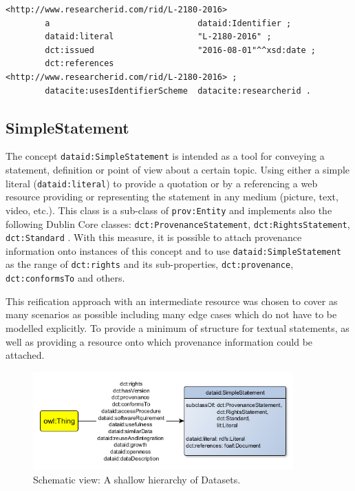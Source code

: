 \documentclass[a4paper,english,twoside,BCOR1.5cm,headsepline,DIV12,appendixprefix,final,12pt]{scrbook}
\newcommand{\prop}[1]{{{\texttt{#1}}}}
\begin{document}
\begin{lstlisting}[language=ttl, captionpos=b,caption=Example of an organisation,label=lst:coresuperset,linewidth=\columnwidth,breaklines=true]
<http://www.researcherid.com/rid/L-2180-2016>
        a                              dataid:Identifier ;
        dataid:literal                 "L-2180-2016" ;                                        
        dct:issued                     "2016-08-01"^^xsd:date ;
        dct:references                 <http://www.researcherid.com/rid/L-2180-2016> ;        
        datacite:usesIdentifierScheme  datacite:researcherid .  
\end{lstlisting}

\subsection{SimpleStatement} 
\label{sec:corestatement}
The concept \prop{dataid:SimpleStatement} is intended as a tool for conveying a statement, definition or point of view about a certain topic. Using either a simple literal (\prop{dataid:literal}) to provide a quotation or by a referencing a web resource providing or representing the statement in any medium (picture, text, video, etc.). This class is a sub-class of \prop{prov:Entity} and implements also the following Dublin Core classes: \prop{dct:ProvenanceStatement}, 
\prop{dct:RightsStatement},
\prop{dct:Standard}
. With this measure, it is possible to attach provenance information onto instances of this concept and to use \prop{dataid:SimpleStatement} as the range of \prop{dct:rights} and its sub-properties, \prop{dct:provenance}, \prop{dct:conformsTo} and others.

This reification approach with an intermediate resource was chosen to cover as many scenarios as possible including many edge cases which do not have to be modelled explicitly. To provide a minimum of structure for textual statements, as well as providing a resource onto which provenance information could be attached.

\begin{figure}[!htbp]
\centering
  \includegraphics[width=10cm]{images/ClassSimpleStatement.png}
  \caption{Schematic view: A shallow hierarchy of Datasets.}
  \label{fig:example}
\end{figure}
\end{document}
